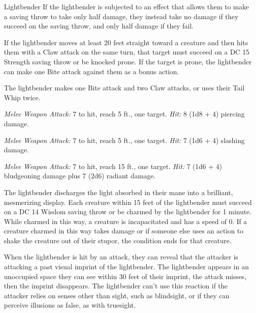\documentclass[10pt,a4paper,twoside,bg=print,twocolumn,openany,nodeprecatedcode]{dndbook}
\begin{document}
\begin{DndMonster}[float=t]{Lightbender}
\DndMonsterBasics[
armor-class = {15 (natural armor)},
hit-points = {\DndDice{12d10 + 36}},
speed = {50 ft.}
]
\DndMonsterAbilityScores[
 str = 18,
 dex = 14,
 con = 16,
 int = 6,
 wis = 12,
 cha = 8
]
\DndMonsterDetails[
skills = {Perception +4, Stealth +8},
senses = {darkvision 60 ft., passive perception 14},
challenge = 5,
]
If the lightbender is subjected to an effect that allows them to make a saving throw to take only half damage, they instead take no damage if they succeed on the saving throw, and only half damage if they fail.

If the lightbender moves at least 20 feet straight toward a creature and then hits them with a Claw attack on the same turn, that target must succeed on a DC 15 Strength saving throw or be knocked prone. If the target is prone, the lightbender can make one Bite attack against them as a bonus action.

The lightbender makes one Bite attack and two Claw attacks, or uses their Tail Whip twice.

\textsl{Melee Weapon Attack:} 7 to hit, reach 5 ft., one target. \textsl{Hit:} 8 (1d8 + 4) piercing damage.

\textsl{Melee Weapon Attack:} 7 to hit, reach 5 ft., one target. \textsl{Hit:} 7 (1d6 + 4) slashing damage.

\textsl{Melee Weapon Attack:} 7 to hit, reach 15 ft., one target. \textsl{Hit:} 7 (1d6 + 4) bludgeoning damage plus 7 (2d6) radiant damage.

The lightbender discharges the light absorbed in their mane into a brilliant, mesmerizing display. Each creature within 15 feet of the lightbender must succeed on a DC 14 Wisdom saving throw or be charmed by the lightbender for 1 minute. While charmed in this way, a creature is incapacitated and has a speed of 0. If a creature charmed in this way takes damage or if someone else uses an action to shake the creature out of their stupor, the condition ends for that creature.

When the lightbender is hit by an attack, they can reveal that the attacker is attacking a past visual imprint of the lightbender. The lightbender appears in an unoccupied space they can see within 30 feet of their imprint, the attack misses, then the imprint disappears. The lightbender can't use this reaction if the attacker relies on senses other than sight, such as blindsight, or if they can perceive illusions as false, as with truesight.

\end{DndMonster}
\end{document}
